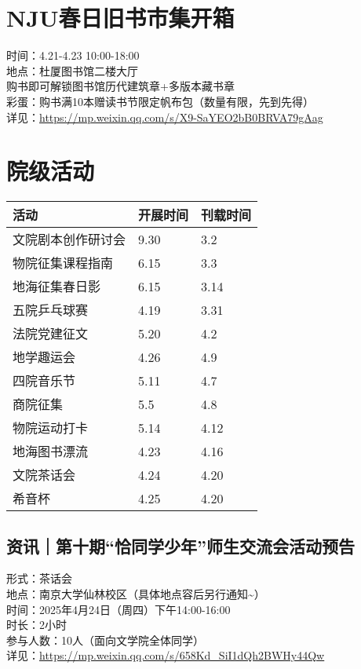 \documentclass[letterpaper, 12pt]{article}
\begin{document}
\begin{multicols}{2}
\section{NJU春日旧书市集开箱} %
时间：4.21-4.23 10:00-18:00
\\地点：杜厦图书馆二楼大厅
\\购书即可解锁图书馆历代建筑章+多版本藏书章
\\ 彩蛋：购书满10本赠读书节限定帆布包（数量有限，先到先得）
\\详见：\url{https://mp.weixin.qq.com/s/X9-SaYEO2bB0BRVA79gAag}
\section{院级活动}
\begin{tabular}{|>{\centering\arraybackslash}m{}|m{}|m{}|}
\hline
    活动 & 开展时间 & 刊载时间\\
    \hline\hline
    文院剧本创作研讨会 & 9.30 & 3.2\\
    物院征集课程指南 & 6.15 & 3.3\\
    地海征集春日影 & 6.15 & 3.14\\
    五院乒乓球赛 & 4.19 & 3.31\\
    法院党建征文 & 5.20 & 4.2\\
    地学趣运会 & 4.26 & 4.9\\
    四院音乐节 & 5.11 & 4.7\\
    商院征集 & 5.5 & 4.8\\
    物院运动打卡 & 5.14 & 4.12\\
    地海图书漂流 & 4.23 & 4.16\\
    文院茶话会 & 4.24 & 4.20\\
    希音杯 & 4.25 & 4.20\\
    \hline
\end{tabular}
\subsection{资讯｜第十期“恰同学少年”师生交流会活动预告} %
形式：茶话会
\\地点：南京大学仙林校区（具体地点容后另行通知\textasciitilde{}）
\\时间：2025年4月24日（周四）下午14:00-16:00
\\时长：2小时
\\参与人数：10人（面向文学院全体同学）
\\详见：\url{https://mp.weixin.qq.com/s/658Kd_SiI1dQh2BWHy44Qw}



\end{multicols}
\end{document}
